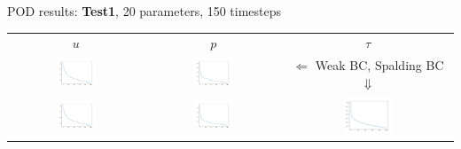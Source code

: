 \documentclass[9pt,compress,t,aspectratio=169]{beamer}
\newcommand{\1}{\begin{pmatrix}
		1\\
		1
\end{pmatrix}}
\newcommand{\highlightB}[1]{\textbf{\color{black!15!orangemathlab}#1}}
\begin{document}
\begin{frame}{POD results: \highlightB{Test1}, 20 parameters, 150 timesteps}
	\begin{tabular}{ccc}
		$u$&$p$&$\tau$\\
		\includegraphics[width=0.31\textwidth]{figures/cylinder_weak_eigs_u.pdf}&
		\includegraphics[width=0.31\textwidth]{figures/cylinder_weak_eigs_p.pdf}&
		$\Leftarrow$ Weak BC, Spalding BC $\Downarrow$
		\\
		\includegraphics[width=0.31\textwidth]{figures/cylinder_spalding_eigs_u.pdf}&
		\includegraphics[width=0.31\textwidth]{figures/cylinder_spalding_eigs_p.pdf}&
		\includegraphics[width=0.31\textwidth]{figures/cylinder_spalding_eigs_tau.pdf}
	\end{tabular}\hfill
\end{frame}
\end{document}
